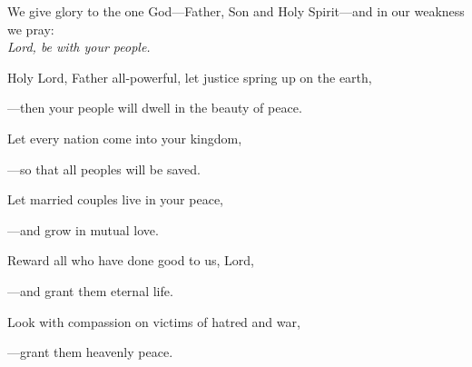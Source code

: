 \intercessions\indent

\begin{hangpar}

We give glory to the one God—Father, Son and Holy Spirit—and in our weakness we pray:\\
\emph{Lord, be with your people.}

\medskip Holy Lord, Father all-powerful, let justice spring up on the earth,

{\color{red}---\thinspace}then your people will dwell in the beauty of peace.

\medskip Let every nation come into your kingdom,

{\color{red}---\thinspace}so that all peoples will be saved.

\medskip Let married couples live in your peace,

{\color{red}---\thinspace}and grow in mutual love.

\medskip Reward all who have done good to us, Lord,

{\color{red}---\thinspace}and grant them eternal life.

\medskip Look with compassion on victims of hatred and war,

{\color{red}---\thinspace}grant them heavenly peace.

\end{hangpar}

